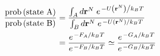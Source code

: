\documentclass{minimal}
\newcommand{\rn}{\mathbf{r}^N}
\newcommand{\rn}[1]{\mathrm{r}^N_{#1}}
\begin{document}
\begin{align}
\frac{ \mathrm{prob} \left( \mbox{state A} \right) }{ \mathrm{prob} \left( \mbox{state B} \right) }
&= \frac { \int_A d\rn \; e^{ \left. -U \left(\rn \right) \right/ k_B T} }{ \int_B d\rn \; e^{ \left. -U \left(\rn \right) \right/ k_B T}  } \nonumber \\
&= \frac{ e^{ \left. -F_A \right/ k_B T} }{ e^{ \left. -F_B \right/ k_B T}  }
\simeq \frac{ e^{ \left. -G_A \right/ k_B T} }{ e^{ \left. -G_B \right/ k_B T}  }
\label{popratio}
\end{align}
\end{document}
